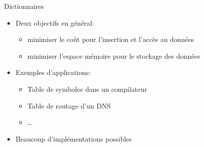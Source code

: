 \begin{frame}{Dictionnaires}
\begin{itemize}
\item Deux objectifs en général:
\begin{itemize}
\item minimiser le coût pour l'insertion et l'accès au données
\item minimiser l'espace mémoire pour le stockage des données
\end{itemize}
\item Exemples d'applications:
\begin{itemize}
\item Table de symboles dans un compilateur
\item Table de routage d'un DNS
\item \ldots
\end{itemize}
\item Beaucoup d'implémentations possibles
\end{itemize}
\end{frame}

